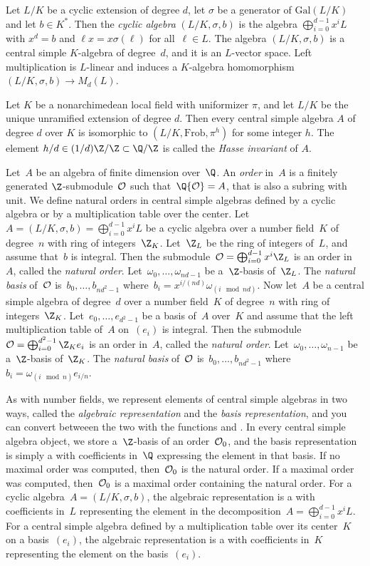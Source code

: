 Let $L/K$ be a cyclic extension of degree $d$, let $\sigma$ be a
generator of $\text{Gal}(L/K)$ and let $b\in K^*$. Then the
\emph{cyclic algebra} $(L/K,\sigma,b)$ is the algebra
$\bigoplus_{i=0}^{d-1}x^iL$ with $x^d=b$ and $\ell x=x\sigma(\ell)$ for
all~$\ell\in L$. The algebra $(L/K,\sigma,b)$ is a central simple $K$-algebra
of degree~$d$, and it is an $L$-vector space. Left multiplication is
$L$-linear and induces a $K$-algebra homomorphism $(L/K,\sigma,b)\to M_d(L)$.

Let $K$ be a nonarchimedean local field with uniformizer $\pi$, and let
$L/K$ be the unique unramified extension of degree $d$. Then every central
simple algebra $A$ of degree $d$ over $K$ is isomorphic to
$(L/K,\text{Frob},\pi^h)$ for some integer $h$. The element $h/d\in
(1/d)\Z/\Z\subset\Q/\Z$ is called the \emph{Hasse invariant} of $A$.

Let~$A$ be an algebra of finite dimension over~$\Q$. An \emph{order}
in~$A$ is a finitely generated $\Z$-submodule~${\cal O}$ such
that~$\Q{\cal O} = A$, that is also a subring with unit. We define natural
orders in central simple algebras defined by a cyclic algebra or by a
multiplication table over the center. Let~$A = (L/K,\sigma,b) =
\bigoplus_{i=0}^{d-1}x^iL$ be a cyclic algebra over a number field~$K$ of
degree~$n$ with ring of integers~$\Z_K$. Let~$\Z_L$ be the ring of integers
of~$L$, and assume that~$b$ is integral. Then the submodule~${\cal O} =
\bigoplus_{i=0}^{d-1}x^i\Z_L$ is an order in~$A$, called the
\emph{natural order}. Let~$\omega_0,\dots,\omega_{nd-1}$ be a~$\Z$-basis
of~$\Z_L$. The \emph{natural basis} of~${\cal O}$ is~$b_0,\dots,b_{nd^2-1}$
where~$b_i = x^{i/(nd)}\omega_{(i \mod nd)}$. Now let~$A$ be a central simple
algebra of degree~$d$ over a number field~$K$ of degree~$n$ with ring of
integers~$\Z_K$. Let~$e_0,\dots,e_{d^2-1}$ be a basis of~$A$ over~$K$ and
assume that the left multiplication table of~$A$ on~$(e_i)$ is integral. Then
the submodule~${\cal O} = \bigoplus_{i=0}^{d^2-1}\Z_K e_i$ is an order
in~$A$, called the \emph{natural order}. Let~$\omega_0,\dots,\omega_{n-1}$ be
a~$\Z$-basis of~$\Z_K$. The \emph{natural basis} of~${\cal O}$
is~$b_0,\dots,b_{nd^2-1}$ where~$b_i = \omega_{(i \mod n)}e_{i/n}$.

As with number fields, we represent elements of central simple algebras
in two ways, called the \emph{algebraic representation} and the \emph{basis
representation}, and you can convert betweeen the two with the functions
 and . In every central simple algebra
object, we store a~$\Z$-basis of an order~${\cal O}_0$, and the basis
representation is simply a  with coefficients in~$\Q$ expressing the
element in that basis. If no maximal order was computed, then~${\cal O}_0$ is
the natural order. If a maximal order was computed, then~${\cal O}_0$ is a
maximal order containing the natural order. For a cyclic algebra~$A =
(L/K,\sigma,b)$, the algebraic representation is a  with coefficients
in~$L$ representing the element in the decomposition~$A =
\bigoplus_{i=0}^{d-1}x^iL$. For a central simple algebra defined by a
multiplication table over its center~$K$ on a basis~$(e_i)$, the algebraic
representation is a  with coefficients in~$K$ representing the element
on the basis~$(e_i)$.

